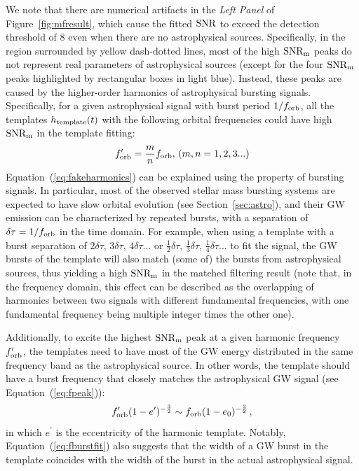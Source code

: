 \documentclass[%
 reprint,
 amsmath,amssymb,
 aps,
]{revtex4-2}
\begin{document}
We note that there are numerical artifacts in the {\it Left Panel} of Figure~\ref{fig:mfresult}, which cause the fitted $\rm SNR$ to exceed the detection threshold of 8 even when there are no astrophysical sources. Specifically, in the region surrounded by yellow dash-dotted lines, most of the high $\rm SNR_m$ peaks do not represent real parameters of astrophysical sources (except for the four $\rm SNR_m$ peaks highlighted by rectangular boxes in light blue). Instead, these peaks are caused by the higher-order harmonics of astrophysical bursting signals. Specifically, for a given astrophysical signal with burst period $1/f_{\rm orb}$, all the templates $h_{\rm template}(t)$ with the following orbital frequencies could have high $\rm SNR_m$ in the template fitting:
\begin{equation}
f_{\rm orb}^{\prime} =
     \frac{m}{n} f_{\rm orb}, \, 
     (m,n=1,2,3...) 
\label{eq:fakeharmonics}   
\end{equation}
Equation~(\ref{eq:fakeharmonics}) can be explained using the property of bursting signals. In particular, most of the observed stellar mass bursting systems are expected to have slow orbital evolution (see Section~\ref{sec:astro}), and their GW emission can be characterized by repeated bursts, with a separation of $\delta\tau=1/f_{\rm orb}$ in the time domain. For example, when using a template with a burst separation of $2\delta\tau,\,3\delta\tau,\, 4\delta\tau...$ or $\frac{1}{2}\delta\tau,\,\frac{1}{3}\delta\tau,\, \frac{1}{4}\delta\tau...$ to fit the signal, the GW bursts of the template will also match (some of) the bursts from astrophysical sources, thus yielding a high $\rm SNR_m$ in the matched filtering result (note that, in the frequency domain, this effect can be described as the overlapping of harmonics between two signals with different fundamental frequencies, with one fundamental frequency being multiple integer times the other one).

Additionally, to excite the highest $\rm SNR_m$ peak at a given harmonic frequency $f^{\prime}_{\rm orb}$, the templates need to have most of the GW energy distributed in the same frequency band as the astrophysical source. In other words, the template should have a burst frequency that closely matches the astrophysical GW signal (see Equation~(\ref{eq:fpeak})):
\begin{equation}
    f^{\prime}_{\rm orb}(1-e^{\prime})^{-\frac{3}{2}}\sim f_{\rm orb}(1-e_0)^{-\frac{3}{2}}\, ,
    \label{eq:fburstfit}
\end{equation}
in which $e^{\prime}$ is the eccentricity of the harmonic template. Notably, Equation~(\ref{eq:fburstfit}) also suggests that the width of a GW burst in the template coincides with the width of the burst in the actual astrophysical signal.
\end{document}
